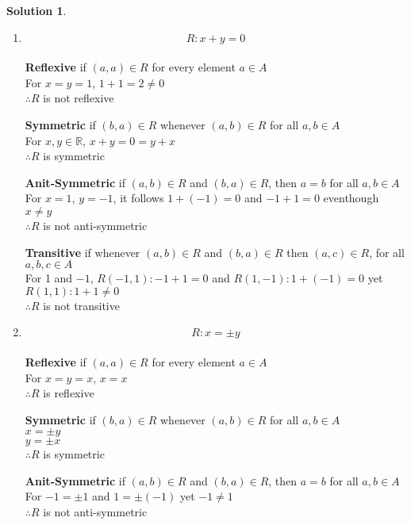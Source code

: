 \documentclass{article}
\theoremstyle{definition}
\newtheorem*{solution}{Solution}
\begin{document}
\begin{solution} \ \\
  \begin{enumerate}[label=(\alph*)]

    \item $$ R: x+y = 0$$ \\
  
      \textbf{Reflexive} if $(a,a) \in R$ for every element $a \in A$ \\
      For $x = y = 1$, $1 + 1 =2 \neq 0$ \\
      $\therefore R$ is not reflexive
    
      \textbf{Symmetric} if $(b,a) \in R$ whenever $(a,b) \in R$ for all $a,b \in A$ \\
      For $x,y \in \mathbb{R}$, $ x+ y = 0 = y + x$ \\
      $\therefore R$ is symmetric
    
      \textbf{Anit-Symmetric} if $(a,b) \in R$ and $(b,a) \in R$, then $a=b$ for all $a,b \in A$ \\
      For $x=1$, $y=-1$, it follows $1 + (-1) = 0$ and $-1 + 1 = 0$ eventhough $x \neq y$\\
      $\therefore R$ is not anti-symmetric 
    
      \textbf{Transitive} if whenever $(a,b) \in R$ and $(b,a) \in R$ then $(a,c) \in R$, for all $a,b,c \in A$ \\
      For 1 and $-1$, $R(-1,1): -1 + 1 = 0$ and $R(1,-1): 1 + (-1) = 0$ yet $R(1,1): 1 + 1 \neq 0$ \\
      $\therefore R$ is not transitive

    \item $$ R: x = \pm y $$ \\
  
      \textbf{Reflexive} if $(a,a) \in R$ for every element $a \in A$ \\
      For $x = y = x$, $x = x$ \\
      $\therefore R$ is reflexive
    
      \textbf{Symmetric} if $(b,a) \in R$ whenever $(a,b) \in R$ for all $a,b \in A$ \\
      $x = \pm y$ \\
      $y = \pm x$ \\
      $\therefore R$ is symmetric
    
      \textbf{Anit-Symmetric} if $(a,b) \in R$ and $(b,a) \in R$, then $a=b$ for all $a,b \in A$ \\
      For $-1 = \pm 1$ and $1 = \pm (-1)$ yet $-1 \neq 1$\\
      $\therefore R$ is not anti-symmetric 
    

\end{enumerate}
\end{solution}
\end{document}
